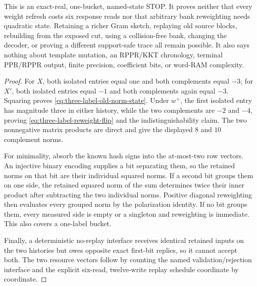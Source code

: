 \begin{proposition}
This is an exact-real, one-bucket, named-state STOP.  It proves neither that
every weight refresh costs six response reads nor that arbitrary bank
reweighting needs quadratic state.  Retaining a richer Gram sketch, replaying
old source blocks, rebuilding from the exposed cut, using a collision-free
bank, changing the decoder, or proving a different support-safe trace all
remain possible.  It also says nothing about template mutation, an RPPR/KKT
chronology, terminal PPR/RPPR output, finite precision, coefficient bits, or
word-RAM complexity.
\end{proposition}

\begin{proof}
For $X$, both isolated entries equal one and both complements equal $-3$;
for $X'$, both isolated entries equal $-1$ and both complements again equal
$-3$.  Squaring proves \cref{eq:three-label-old-norm-state}.  Under
$w^+$, the first isolated entry has magnitude three in either history, while
the two complements are $-2$ and $-4$, proving
\cref{eq:three-label-reweight-flip} and the indistinguishability claim.  The
two nonnegative matrix products are direct and give the displayed $8$ and
$10$ complement norms.

For minimality, absorb the known hash signs into the at-most-two row vectors.
An injective binary encoding supplies a bit separating them, so the retained
norms on that bit are their individual squared norms.  If a second bit groups
them on one side, the retained squared norm of the sum determines twice their
inner product after subtracting the two individual norms.  Positive diagonal
reweighting then evaluates every grouped norm by the polarization identity.
If no bit groups them, every measured side is empty or a singleton and
reweighting is immediate.  This also covers a one-label bucket.

Finally, a deterministic no-replay interface receives identical retained
inputs on the two histories but owes opposite exact first-bit replies, so it
cannot accept both.  The two resource vectors follow by counting the named
validation/rejection interface and the explicit six-read, twelve-write replay
schedule coordinate by coordinate.
\end{proof}

